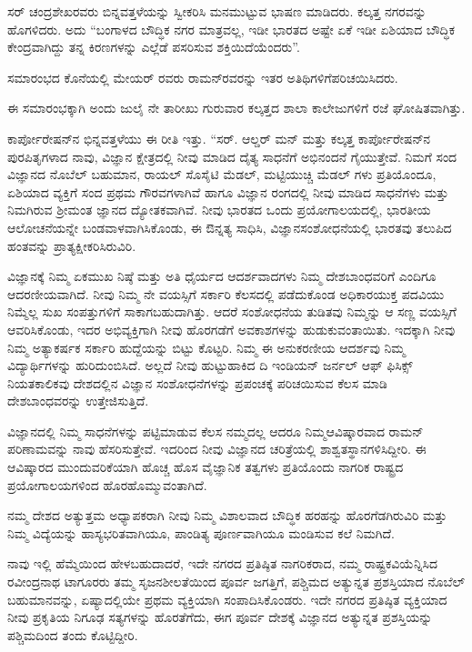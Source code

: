 \newpage

ಸರ್ ಚಂದ್ರಶೇಖರವರು ಬಿನ್ನವತ್ತಳೆಯನ್ನು ಸ್ವೀಕರಿಸಿ ಮನಮುಟ್ಟುವ ಭಾಷಣ ಮಾಡಿದರು. ಕಲ್ಕತ್ತ ನಗರವನ್ನು ಹೊಗಳಿದರು. ಅದು “ಬಂಗಾಳದ ಬೌದ್ಧಿಕ ನಗರ ಮಾತ್ರವಲ್ಲ, ಇಡೀ ಭಾರತದ ಅಷ್ಟೇ ಏಕೆ ಇಡೀ ಏಶಿಯಾದ ಬೌದ್ಧಿಕ ಕೇಂದ್ರವಾಗಿದ್ದು ತನ್ನ ಕಿರಣಗಳನ್ನು ಎಲ್ಲೆಡೆ ಪಸರಿಸುವ ಶಕ್ತಿಯಿದೆಯೆಂದರು”.

ಸಮಾರಂಭದ ಕೊನೆಯಲ್ಲಿ ಮೇಯರ್ ರವರು ರಾಮನ್‍ರವರನ್ನು ಇತರ ಅತಿಥಿಗಳಿಗೆ\break ಪರಿಚಯಿಸಿದರು.

ಈ ಸಮಾರಂಭಕ್ಕಾಗಿ ಅಂದು ಜುಲೈ ನೇ ತಾರೀಖು ಗುರುವಾರ ಕಲ್ಕತ್ತದ ಶಾಲಾ ಕಾಲೇಜುಗಳಿಗೆ ರಜೆ ಘೋಷಿತವಾಗಿತ್ತು.

ಕಾರ್ಪೋರೇಷನ್‍ನ ಭಿನ್ನವತ್ತಳೆಯು ಈ ರೀತಿ ಇತ್ತು. “ಸರ್. ಆಲ್ಡರ್ ಮನ್ ಮತ್ತು ಕಲ್ಕತ್ತ ಕಾರ್ಪೋರೇಷನ್‍ನ ಪುರಪಿತೃಗಳಾದ ನಾವು, ವಿಜ್ಞಾನ ಕ್ಷೇತ್ರದಲ್ಲಿ ನೀವು ಮಾಡಿದ ದೈತ್ಯ ಸಾಧನೆಗೆ ಅಭಿನಂದನೆ ಗೈಯುತ್ತೇವೆ. ನಿಮಗೆ ಸಂದ ವಿಜ್ಞಾನದ ನೊಬೆಲ್ ಬಹುಮಾನ, ರಾಯಲ್ ಸೊಸೈಟಿ ಮೆಡಲ್, ಮಟ್ಟಿಯುಚ್ಚಿ ಮೆಡಲ್ ಗಳು ಪ್ರತಿಯೊಂದೂ, ಏಶಿಯಾದ ವ್ಯಕ್ತಿಗೆ ಸಂದ ಪ್ರಥಮ ಗೌರವಗಳಾಗಿವೆ ಹಾಗೂ ವಿಜ್ಞಾನ ರಂಗದಲ್ಲಿ ನೀವು ಮಾಡಿದ ಸಾಧನೆಗಳು ಮತ್ತು ನಿಮಗಿರುವ ಶ‍್ರೀಮಂತ ಜ್ಞಾನದ ದ್ಯೋತಕವಾಗಿವೆ. ನೀವು ಭಾರತದ ಒಂದು ಪ್ರಯೋಗಾಲಯದಲ್ಲಿ, ಭಾರತೀಯ ಆಲೋಚನೆಯನ್ನೇ ಬಂಡವಾಳವಾಗಿಸಿಕೊಂಡು, ಈ ಔನ್ನತ್ಯ ಸಾಧಿಸಿ, ವಿಜ್ಞಾನ\break ಸಂಶೋಧನೆಯಲ್ಲಿ ಭಾರತವು ತಲುಪಿದ ಹಂತವನ್ನು ಪ್ರಾತ್ಯಕ್ಷೀಕರಿಸಿರುವಿರಿ.

ವಿಜ್ಞಾನಕ್ಕೆ ನಿಮ್ಮ ಏಕಮುಖ ನಿಷ್ಠೆ ಮತ್ತು ಅತಿ ಧೈರ್ಯದ ಆದರ್ಶವಾದಗಳು ನಿಮ್ಮ ದೇಶ\-ಬಾಂಧವರಿಗೆ ಎಂದಿಗೂ ಆದರಣೀಯವಾಗಿದೆ. ನೀವು ನಿಮ್ಮ ನೇ ವಯಸ್ಸಿಗೆ ಸರ್ಕಾರಿ ಕೆಲಸದಲ್ಲಿ ಪಡೆದುಕೊಂಡ ಅಧಿಕಾರಯುಕ್ತ ಪದವಿಯು ನಿಮ್ಮೆಲ್ಲ ಸುಖ ಸಂಪತ್ತುಗಳಿಗೆ ಸಾಕಾಗಬಹುದಾಗಿತ್ತು. ಆದರೆ ಸಂಶೋಧನೆಯ ತುಡಿತವು ನಿಮ್ಮನ್ನು ಆ ಸಣ್ಣ ವಯಸ್ಸಿಗೆ ಆವರಿಸಿಕೊಂಡು, ಇದರ ಅಭಿವ್ಯಕ್ತಿಗಾಗಿ ನೀವು ಹೊರಗಡೆಗೆ ಅವಕಾಶಗಳನ್ನು ಹುಡುಕುವಂತಾಯಿತು. ಇದಕ್ಕಾಗಿ ನೀವು ನಿಮ್ಮ ಅತ್ಯಾಕರ್ಷಕ ಸರ್ಕಾರಿ ಹುದ್ದೆಯನ್ನು ಬಿಟ್ಟು ಕೊಟ್ಟರಿ. ನಿಮ್ಮ ಈ ಅನುಕರಣೀಯ ಆದರ್ಶವು ನಿಮ್ಮ ವಿದ್ಯಾರ್ಥಿಗಳನ್ನು ಹುರಿದುಂಬಿಸಿದೆ. ಅಲ್ಲದೆ ನೀವು ಹುಟ್ಟುಹಾಕಿದ ದಿ ಇಂಡಿಯನ್ ಜರ್ನಲ್ ಆಫ್ ಫಿಸಿಕ್ಸ್ ನಿಯತಕಾಲಿಕವು ದೇಶದಲ್ಲಿನ ವಿಜ್ಞಾನ ಸಂಶೋಧನೆಗಳನ್ನು ಪ್ರಪಂಚಕ್ಕೆ ಪರಿಚಯಿಸುವ ಕೆಲಸ ಮಾಡಿ ದೇಶಬಾಂಧವರನ್ನು ಉತ್ತೇಜಿಸುತ್ತಿದೆ.

ವಿಜ್ಞಾನದಲ್ಲಿ ನಿಮ್ಮ ಸಾಧನೆಗಳನ್ನು ಪಟ್ಟಿಮಾಡುವ ಕೆಲಸ ನಮ್ಮದಲ್ಲ ಆದರೂ ನಿಮ್ಮ\break ಆವಿಷ್ಕಾರವಾದ ರಾಮನ್ ಪರಿಣಾಮವನ್ನು ನಾವು ಹೆಸರಿಸುತ್ತೇವೆ. ಇದರಿಂದ ನೀವು ವಿಜ್ಞಾನದ ಚರಿತ್ರೆಯಲ್ಲಿ ಶಾಶ್ವತಸ್ಥಾನಗಳಿಸಿದ್ದೀರಿ. ಈ ಆವಿಷ್ಕಾರದ ಮುಂದುವರಿಕೆಯಾಗಿ ಹೊಚ್ಚ ಹೊಸ ವೈಜ್ಞಾನಿಕ ತತ್ವಗಳು ಪ್ರತಿಯೊಂದು ನಾಗರಿಕ ರಾಷ್ಟ್ರದ ಪ್ರಯೋಗಾಲಯಗಳಿಂದ ಹೊರಹೊಮ್ಮು\-ವಂತಾಗಿದೆ.

ನಮ್ಮ ದೇಶದ ಅತ್ಯುತ್ತಮ ಅಧ್ಯಾಪಕರಾಗಿ ನೀವು ನಿಮ್ಮ ವಿಶಾಲವಾದ ಬೌದ್ಧಿಕ ಹರಹನ್ನು ಹೊರಗೆಡಗಿರುವಿರಿ ಮತ್ತು ನಿಮ್ಮ ವಿದ್ಯೆಯನ್ನು ಹಾಸ್ಯಭರಿತವಾಗಿಯೂ, ಪಾಂಡಿತ್ಯ ಪೂರ್ಣವಾಗಿಯೂ ಮಂಡಿಸುವ ಕಲೆ ನಿಮಗಿದೆ.

ನಾವು ಇಲ್ಲಿ ಹೆಮ್ಮೆಯಿಂದ ಹೇಳಬಹುದಾದರೆ, ಇದೇ ನಗರದ ಪ್ರತಿಷ್ಠಿತ ನಾಗರಿಕರಾದ, ನಮ್ಮ ರಾಷ್ಟ್ರಕವಿಯೆನ್ನಿಸಿದ ರವೀಂದ್ರನಾಥ ಟಾಗೂರರು ತಮ್ಮ ಸೃಜನಶೀಲತೆಯಿಂದ ಪೂರ್ವ ಜಗತ್ತಿಗೆ, ಪಶ್ಚಿಮದ ಅತ್ಯುನ್ನತ ಪ್ರಶಸ್ತಿಯಾದ ನೊಬೆಲ್ ಬಹುಮಾನವನ್ನು, ಏಷ್ಯಾದಲ್ಲಿಯೇ ಪ್ರಥಮ ವ್ಯಕ್ತಿಯಾಗಿ ಸಂಪಾದಿಸಿಕೊಂಡರು. ಇದೇ ನಗರದ ಪ್ರತಿಷ್ಠಿತ ವ್ಯಕ್ತಿಯಾದ ನೀವು ಪ್ರಕೃತಿಯ ನಿಗೂಢ ಸತ್ಯಗಳನ್ನು ಹೊರತೆಗೆದು, ಈಗ ಪೂರ್ವ ದೇಶಕ್ಕೆ ವಿಜ್ಞಾನದ ಅತ್ಯುನ್ನತ ಪ್ರಶಸ್ತಿಯನ್ನು ಪಶ್ಚಿಮದಿಂದ ತಂದು ಕೊಟ್ಟಿದ್ದೀರಿ.

